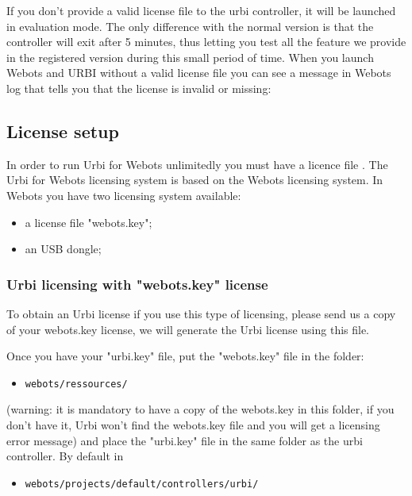 If you don't provide a valid license file to the urbi controller, it
will be launched in evaluation mode. The only difference with the
normal version is that the controller will exit after 5 minutes, thus
letting you test all the feature we provide in the registered version
during this small period of time. When you launch Webots and URBI
without a valid license file you can see a message in Webots log that
tells you that the license is invalid or missing:




\subsection{License setup}
\label{webots.license}%

In order to run Urbi for Webots unlimitedly you must have a licence
file .  The Urbi for Webots licensing system is based on the Webots
licensing system.  In Webots you have two licensing system available:
\begin{itemize}
\item a license file "webots.key";
\item an USB dongle;
\end{itemize}


\subsubsection{Urbi licensing with "webots.key" license}
\label{webots.license.webotskey}%

To obtain an Urbi license if you use this type of licensing, please
send us a copy of your webots.key license, we will generate the Urbi
license using this file.


Once you have your "urbi.key" file, put the "webots.key" file in the
folder:
\begin{itemize}

\item \nolinkurl{webots/ressources/}

\end{itemize}
(warning: it is mandatory to have a copy of the webots.key in this
folder, if you don't have it, Urbi won't find the webots.key file and
you will get a licensing error message) and place the "urbi.key" file
in the same folder as the urbi controller. By default in
\begin{itemize}

\item \nolinkurl{webots/projects/default/controllers/urbi/}

\end{itemize}


